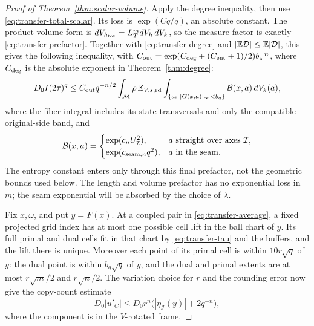 \begin{proof}[Proof of Theorem~\ref{thm:scalar-volume}]
Apply the degree inequality, then use
\eqref{eq:transfer-total-scalar}.  Its loss is \(\exp(Cq/q)\), an
absolute constant.  The product volume form is
\(dV_{h_{\rm tot}}=L_T^m dV_h\,dV_k\), so the measure factor is
exactly \eqref{eq:transfer-prefactor}.  Together with
\eqref{eq:transfer-degree} and \(|\mathbb E\mathcal D|\leq\mathbb E|\mathcal D|\),
this gives the following inequality, with
\(C_{\rm out}=\exp(C_{\rm deg}+(C_{\rm ent}+1)/2)b_*^{-n}\), where
\(C_{\rm deg}\) is the absolute exponent in Theorem~\ref{thm:degree}:
\begin{equation}\label{eq:transfer-average}
 \begin{split}
 D_0I(2\tau)^q\leq C_{\rm out}q^{-n/2}
  \int_{\mathcal M}\rho\,
   \mathbb E_{V,s,\rm rd}
     \int_{\{a:\ |G(x,a)|_\infty<b_q\}}
                       \mathcal B(x,a)\,dV_k(a),
 \end{split}
\end{equation}
where the fiber integral includes its state transversals and only the
compatible original-side band, and
\[
 \mathcal B(x,a)=
 \begin{cases}
    \exp(c_nU_{\mathcal I}^2),&a\text{ straight over axes }\mathcal I,\\
    \exp(c_{{\rm seam},n}q^2),&a\text{ in the seam}.
 \end{cases}
\]
The entropy constant enters only through this final prefactor, not the
geometric bounds used below.  The length and volume prefactor has no
exponential loss in \(m\); the seam exponential will be absorbed by
the choice of \(\lambda\).

Fix \(x,\omega\), and put \(y=F(x)\).  At a coupled pair in
\eqref{eq:transfer-average}, a fixed projected grid index has at most
one possible cell lift in the ball chart of \(y\).  Its full primal
and dual cells fit in that chart by \eqref{eq:transfer-tau} and the
buffers, and the lift there is unique.  Moreover each point of its
primal cell is within \(10r\sqrt q\) of \(y\): the dual point is
within \(b_q\sqrt q\) of \(y\), and the dual and primal extents are
at most \(r\sqrt m/2\) and \(r\sqrt n/2\).  The variation choice
for \(r\) and the rounding error now give the copy-count estimate
\begin{equation}\label{eq:transfer-copies}
       D_0|u'_C|\leq D_0r^n
                        \bigl(|\eta_{\mathcal I}(y)|+2q^{-n}\bigr),
\end{equation}
where the component is in the \(V\)-rotated frame.


\end{proof}
